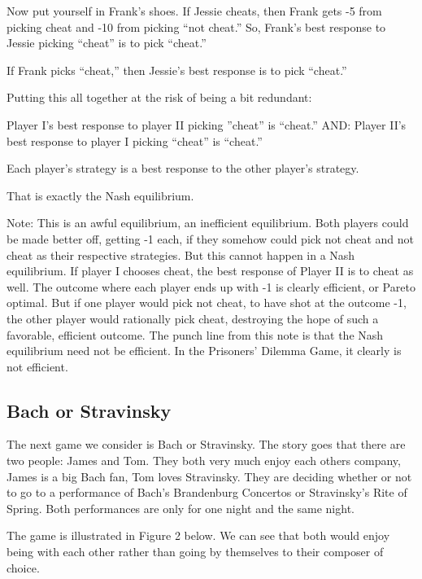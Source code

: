 \documentclass[
]{book}
\begin{document}
Now put yourself in Frank's shoes. If Jessie cheats, then Frank gets -5 from picking cheat and -10 from picking ``not cheat.'' So, Frank's best response to Jessie picking ``cheat'' is to pick ``cheat.''

If Frank picks ``cheat,'' then Jessie's best response is to pick ``cheat.''

Putting this all together at the risk of being a bit redundant:

\begin{center}
Player I's best response to player II picking ''cheat'' is ``cheat.''
AND:
Player II's best response to player I picking ``cheat'' is ``cheat.''

\end{center}

Each player's strategy is a best response to the other player's strategy.

That is exactly the Nash equilibrium.

Note: This is an awful equilibrium, an inefficient equilibrium. Both players could be made better off, getting -1 each, if they somehow could pick not cheat and not cheat as their respective strategies. But this cannot happen in a Nash equilibrium. If player I chooses cheat, the best response of Player II is to cheat as well. The outcome where each player ends up with -1 is clearly efficient, or Pareto optimal. But if one player would pick not cheat, to have shot at the outcome -1, the other player would rationally pick cheat, destroying the hope of such a favorable, efficient outcome. The punch line from this note is that the Nash equilibrium need not be efficient. In the Prisoners' Dilemma Game, it clearly is not efficient.

\hypertarget{bach-or-stravinsky}{%
\subsection{Bach or Stravinsky}\label{bach-or-stravinsky}}

The next game we consider is Bach or Stravinsky. The story goes that there are two people: James and Tom. They both very much enjoy each others company, James is a big Bach fan, Tom loves Stravinsky. They are deciding whether or not to go to a performance of Bach's Brandenburg Concertos or Stravinsky's Rite of Spring. Both performances are only for one night and the same night.

The game is illustrated in Figure 2 below. We can see that both would enjoy being with each other rather than going by themselves to their composer of choice.
\end{document}
